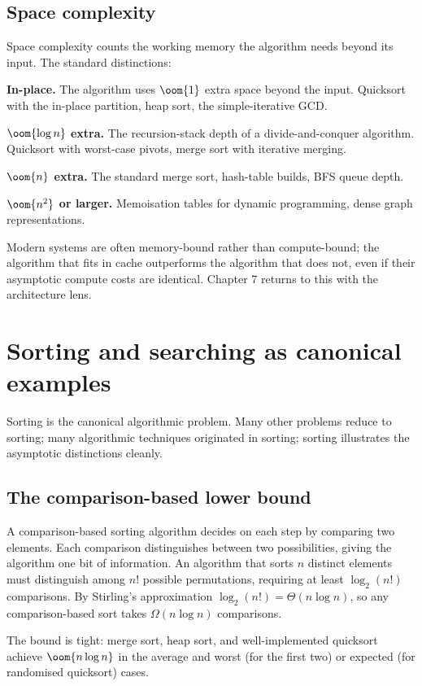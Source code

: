 \subsection{Space complexity}

Space complexity counts the working memory the algorithm needs beyond its input. The standard distinctions:

\textbf{In-place.} The algorithm uses $\oom{1}$ extra space beyond the input. Quicksort with the in-place partition, heap sort, the simple-iterative GCD.

\textbf{$\oom{\log n}$ extra.} The recursion-stack depth of a divide-and-conquer algorithm. Quicksort with worst-case pivots, merge sort with iterative merging.

\textbf{$\oom{n}$ extra.} The standard merge sort, hash-table builds, BFS queue depth.

\textbf{$\oom{n^2}$ or larger.} Memoisation tables for dynamic programming, dense graph representations.

Modern systems are often memory-bound rather than compute-bound; the algorithm that fits in cache outperforms the algorithm that does not, even if their asymptotic compute costs are identical. Chapter 7 returns to this with the architecture lens.

\section{Sorting and searching as canonical examples}

Sorting is the canonical algorithmic problem. Many other problems reduce to sorting; many algorithmic techniques originated in sorting; sorting illustrates the asymptotic distinctions cleanly.

\subsection{The comparison-based lower bound}

A comparison-based sorting algorithm decides on each step by comparing two elements. Each comparison distinguishes between two possibilities, giving the algorithm one bit of information. An algorithm that sorts $n$ distinct elements must distinguish among $n!$ possible permutations, requiring at least $\log_2(n!)$ comparisons. By Stirling's approximation $\log_2(n!) = \Theta(n \log n)$, so any comparison-based sort takes $\Omega(n \log n)$ comparisons.

The bound is tight: merge sort, heap sort, and well-implemented quicksort achieve $\oom{n \log n}$ in the average and worst (for the first two) or expected (for randomised quicksort) cases.

